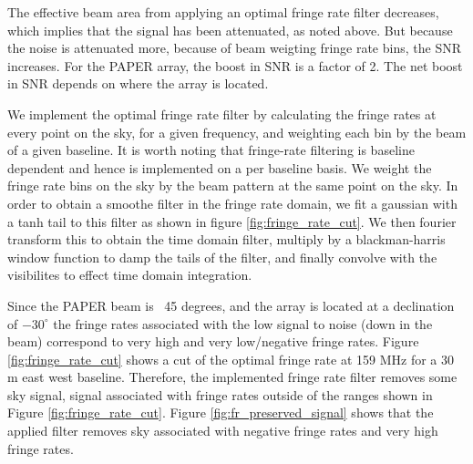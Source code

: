 \documentclass[twocolumn,numberedappendix]{emulateapj} \shorttitle{PSA64}
\begin{document}
The effective beam area from applying an optimal fringe rate filter decreases,
which implies that the signal has been attenuated, as noted above. But because
the noise is attenuated more, because of beam weigting fringe rate bins, the SNR
increases. For the PAPER array, the boost in SNR is a factor of 2. The net boost
in SNR depends on where the array is located. 

We implement the optimal fringe rate filter by calculating the fringe rates at
every point on the sky, for a given frequency, and weighting each bin by the
beam of a given baseline. It is worth noting that fringe-rate filtering is
baseline dependent and hence is implemented on a per baseline basis. We weight
the fringe rate bins on the sky by the beam pattern at the same point on the
sky. In order to obtain a smoothe filter in the fringe rate domain, we fit a
gaussian with a tanh tail to this filter as shown in figure
\ref{fig:fringe_rate_cut}. We then fourier transform this to obtain the time
domain filter, multiply by a blackman-harris window function to damp the tails
of the filter, and finally convolve with the visibilites to effect time domain
integration.

Since the PAPER beam is ~45 degrees, and the array is located at a declination
of $-30^{\circ}$ the fringe rates associated with the low signal to noise (down
in the beam) correspond to very high and very low/negative fringe rates. Figure
\ref{fig:fringe_rate_cut} shows a cut of the optimal fringe rate at 159 MHz for
a 30 m east west baseline. Therefore, the implemented fringe rate filter removes
some sky signal, signal associated with fringe rates outside of the ranges shown
in Figure \ref{fig:fringe_rate_cut}. Figure \ref{fig:fr_preserved_signal} shows
that the applied filter removes sky associated with negative fringe rates and
very high fringe rates. 

\end{document}
